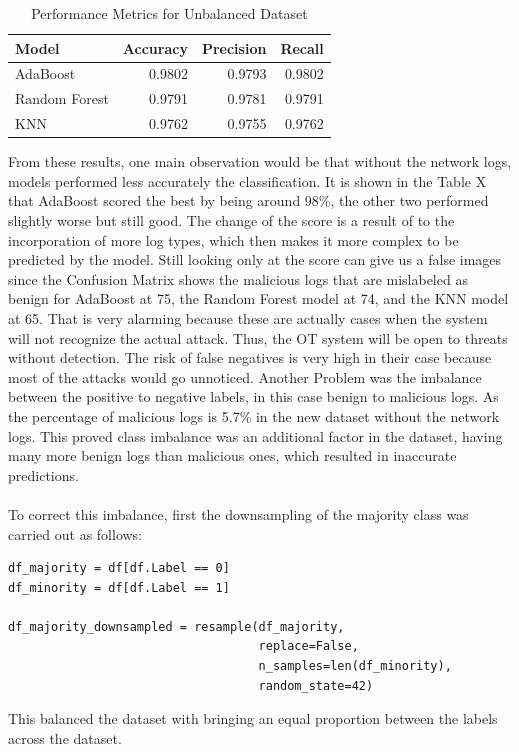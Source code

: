 \documentclass[Master,BMR,english]{twbook}
\begin{document}
\begin{table}[!htbp]
\centering
\begin{tabular}{|l|r|r|r|}
\hline
\textbf{Model} & \textbf{Accuracy} & \textbf{Precision} & \textbf{Recall} \\ \hline
AdaBoost & 0.9802 & 0.9793 & 0.9802 \\ \hline
Random Forest & 0.9791 & 0.9781 & 0.9791 \\ \hline
KNN & 0.9762 & 0.9755 & 0.9762 \\ \hline
\end{tabular}
\caption{Performance Metrics for Unbalanced Dataset}
\label{tab:unbalanced_metrics}
\end{table}
From these results, one main observation would be that without the network logs, models performed less accurately the classification. It is shown in the Table X that AdaBoost scored the best by being around 98\%, the other two performed slightly worse but still good. The change of the score is a result of to the incorporation of more log types, which then makes it more complex to be predicted by the model. Still looking only at the score can give us a false images since the Confusion Matrix shows the malicious logs that are mislabeled as benign for AdaBoost at 75, the Random Forest model at 74, and the KNN model at 65. That is very alarming because these are actually cases when the system will not recognize the actual attack. Thus, the OT system will be open to threats without detection. The risk of false negatives is very high in their case because most of the attacks would go unnoticed. Another Problem was the imbalance between the positive to negative labels, in this case benign to malicious logs. As the percentage of malicious logs is 5.7\% in the new dataset without the network logs. This proved class imbalance was an additional factor in the dataset, having many more benign logs than malicious ones, which resulted in inaccurate predictions.\\\\
To correct this imbalance, first the downsampling of the majority class was carried out as follows:

\begin{listing}[htbp]
\begin{verbatim}
df_majority = df[df.Label == 0]
df_minority = df[df.Label == 1]

df_majority_downsampled = resample(df_majority,
                                   replace=False,  
                                   n_samples=len(df_minority),
                                   random_state=42)
\end{verbatim}
\caption{Python code for downsampling majority class to balance dataset.}
\label{listing:downsample_code}
\end{listing}
This balanced the dataset with bringing an equal proportion between the labels across the dataset.
\end{document}
